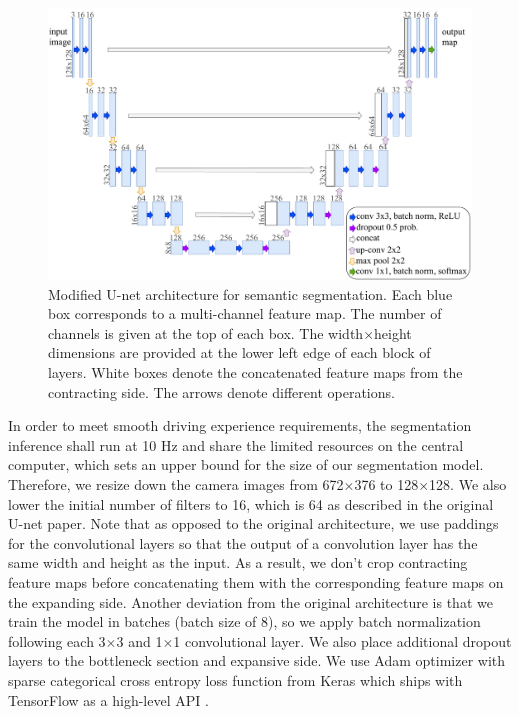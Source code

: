 \begin{figure}[h]
  \centering
  \includegraphics[width=1.0\textwidth]{figures/unet-architecture.pdf}
  \caption[Modified U-net semantic segmentation architecture]{Modified U-net
    architecture for semantic segmentation. Each blue box corresponds to a
    multi-channel feature map. The number of channels is given at the top of
    each box. The width$\times$height dimensions are provided at the lower left
    edge of each block of layers. White boxes denote the concatenated feature
    maps from the contracting side. The arrows denote different operations.}
  \label{figure:unet-architecture}
\end{figure}

In order to meet smooth driving experience requirements, the segmentation
inference shall run at 10 Hz and share the limited resources on the central
computer, which sets an upper bound for the size of our segmentation model.
Therefore, we resize down the camera images from 672$\times$376 to
128$\times$128. We also lower the initial number of filters to 16, which is 64
as described in the original U-net paper. Note that as opposed to the original
architecture, we use paddings for the convolutional layers so that the output
of a convolution layer has the same width and height as the input. As a result,
we don't crop contracting feature maps before concatenating them with the
corresponding feature maps on the expanding side. Another deviation from the
original architecture is that we train the model in batches (batch size of 8),
so we apply batch normalization following each 3$\times$3 and 1$\times$1
convolutional layer. We also place additional dropout layers to the bottleneck
section and expansive side. We use Adam optimizer with sparse categorical cross
entropy loss function from Keras which ships with TensorFlow as a high-level
API \cite{Abadi2015TF, Chollet2015Keras}.

